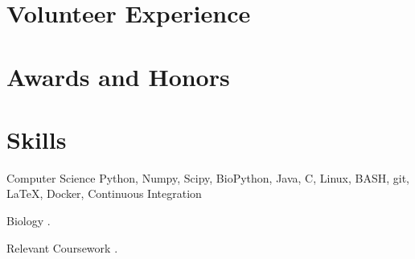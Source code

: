\documentclass{bscv}
\begin{document}
\section{Volunteer Experience}

\begin{eventlist}
 
\end{eventlist}

\section{Awards and Honors}
\begin{yearlist}
\end{yearlist}

\section{Skills}

\begin{factlist}

\item{Computer Science}
     {Python, Numpy, Scipy, BioPython, Java, C, Linux, BASH, git, \LaTeX, Docker, Continuous Integration}

\item{Biology}
  {. }

\item{Relevant Coursework}
  { . }
\end{factlist}
  
\end{document}
